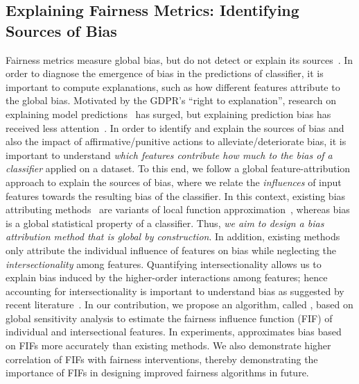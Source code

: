 \subsection*{Explaining Fairness Metrics: Identifying Sources of Bias}
Fairness metrics measure global bias, but do not detect or explain its sources~\cite{begley2020explainability,lundberg2020explaining,pan2021explaining}.
In order to diagnose the emergence of bias in the predictions of classifier, it is important to compute explanations, such as how different features attribute to the global bias. Motivated by the GDPR's ``right to explanation'', research on explaining model predictions~\cite{ribeiro2016should,lundberg2017unified,lundberg2020local2global} has surged, but explaining prediction bias has received less attention~\cite{begley2020explainability,lundberg2020explaining}. In order to identify and explain the sources of bias and also the impact of affirmative/punitive actions to alleviate/deteriorate bias, it is important to understand \textit{which features contribute how much to the bias of a classifier} applied on a dataset. To this end, we follow a global feature-attribution approach to explain the sources of bias, where we relate the \emph{influences} of input features towards the resulting bias of the classifier. In this context, existing bias attributing methods~\cite{begley2020explainability,lundberg2020explaining} are variants of local function approximation~\cite{sliwinski2019axiomatic}, whereas bias is a global statistical property of a classifier. Thus, \textit{we aim to design a bias attribution method that is global by construction}. In addition, existing methods only attribute the individual influence of features on bias while neglecting the \textit{intersectionality} among features. Quantifying intersectionality allows us to explain bias induced by the higher-order interactions among features; hence accounting for intersectionality is important to understand bias as suggested by recent literature~\cite{buolamwini2018gender,wang2022towards}.  In our contribution, we propose an algorithm, called {\fairXplainer}, based on global sensitivity analysis to estimate the fairness influence function (FIF) of individual and intersectional features. In experiments, {\fairXplainer} approximates bias based on FIFs more accurately than existing methods. We also demonstrate higher correlation of FIFs with fairness interventions, thereby demonstrating the importance of FIFs in designing improved fairness algorithms in future.

